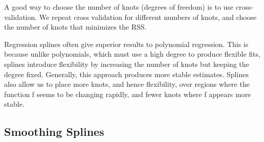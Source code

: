 \documentclass[
]{article}
\begin{document}
A good way to choose the number of knots (degrees of freedom) is to use
cross-validation. We repeat cross validation for different numbers of
knots, and choose the number of knots that minimizes the RSS.

Regression splines often give superior results to polynomial regression.
This is because unlike polynomials, which must use a high degree to
produce flexible fits, splines introduce flexibility by increasing the
number of knots but keeping the degree fixed. Generally, this approach
produces more stable estimates. Splines also allow us to place more
knots, and hence flexibility, over regions where the function f seems to
be changing rapidly, and fewer knots where f appears more stable.

\hypertarget{smoothing-splines}{%
\subsection{Smoothing Splines}\label{smoothing-splines}}
\end{document}
